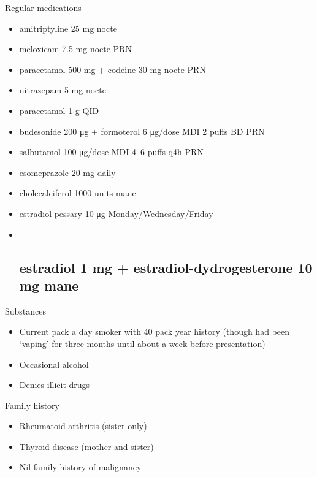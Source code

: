 \documentclass[
  ignorenonframetext,
]{beamer}
\providecommand{\tightlist}{%
  \setlength{\itemsep}{0pt}\setlength{\parskip}{0pt}}
\begin{document}
\begin{frame}{Regular medications}
\protect\hypertarget{regular-medications}{}
\begin{itemize}
\item
  amitriptyline 25 mg nocte
\item
  meloxicam 7.5 mg nocte PRN
\item
  paracetamol 500 mg + codeine 30 mg nocte PRN
\item
  nitrazepam 5 mg nocte
\item
  paracetamol 1 g QID
\item
  budesonide 200 μg + formoterol 6 μg/dose MDI 2 puffs BD PRN
\item
  salbutamol 100 μg/dose MDI 4--6 puffs q4h PRN
\item
  esomeprazole 20 mg daily
\item
  cholecalciferol 1000 units mane
\item
  estradiol pessary 10 μg Monday/Wednesday/Friday
\item ~
  \hypertarget{estradiol-1-mg-estradiol-dydrogesterone-10-mg-mane}{%
  \subsection{estradiol 1 mg + estradiol-dydrogesterone 10 mg
  mane}\label{estradiol-1-mg-estradiol-dydrogesterone-10-mg-mane}}
\end{itemize}
\end{frame}

\begin{frame}{Substances}
\protect\hypertarget{substances}{}
\begin{itemize}
\tightlist
\item
  Current pack a day smoker with 40 pack year history (though had been
  `vaping' for three months until about a week before presentation)
\item
  Occasional alcohol
\item
  Denies illicit drugs
\end{itemize}
\end{frame}

\begin{frame}{Family history}
\protect\hypertarget{family-history}{}
\begin{itemize}
\tightlist
\item
  Rheumatoid arthritis (sister only)
\item
  Thyroid disease (mother and sister)
\item
  Nil family history of malignancy
\end{itemize}
\end{frame}
\end{document}

